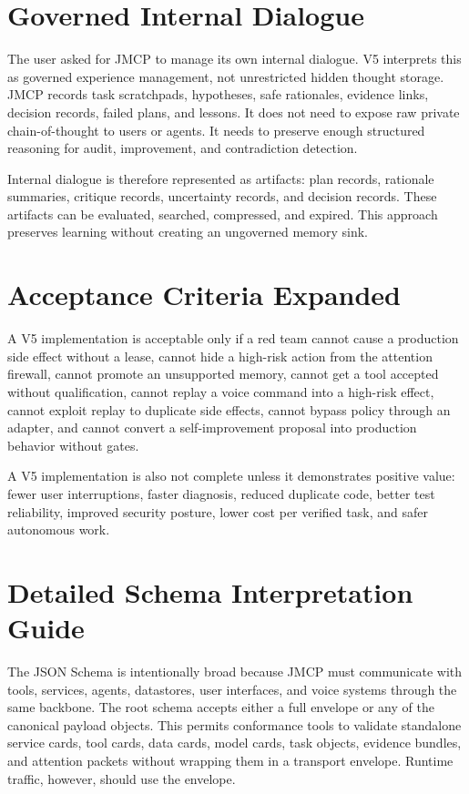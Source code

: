 \documentclass[10pt,journal,onecolumn]{IEEEtran}
\begin{document}
\section{Governed Internal Dialogue}
The user asked for JMCP to manage its own internal dialogue. V5 interprets this as governed experience management, not unrestricted hidden thought storage. JMCP records task scratchpads, hypotheses, safe rationales, evidence links, decision records, failed plans, and lessons. It does not need to expose raw private chain-of-thought to users or agents. It needs to preserve enough structured reasoning for audit, improvement, and contradiction detection.

Internal dialogue is therefore represented as artifacts: plan records, rationale summaries, critique records, uncertainty records, and decision records. These artifacts can be evaluated, searched, compressed, and expired. This approach preserves learning without creating an ungoverned memory sink.

\section{Acceptance Criteria Expanded}
A V5 implementation is acceptable only if a red team cannot cause a production side effect without a lease, cannot hide a high-risk action from the attention firewall, cannot promote an unsupported memory, cannot get a tool accepted without qualification, cannot replay a voice command into a high-risk effect, cannot exploit replay to duplicate side effects, cannot bypass policy through an adapter, and cannot convert a self-improvement proposal into production behavior without gates.

A V5 implementation is also not complete unless it demonstrates positive value: fewer user interruptions, faster diagnosis, reduced duplicate code, better test reliability, improved security posture, lower cost per verified task, and safer autonomous work.




\section{Detailed Schema Interpretation Guide}
The JSON Schema is intentionally broad because JMCP must communicate with tools, services, agents, datastores, user interfaces, and voice systems through the same backbone. The root schema accepts either a full envelope or any of the canonical payload objects. This permits conformance tools to validate standalone service cards, tool cards, data cards, model cards, task objects, evidence bundles, and attention packets without wrapping them in a transport envelope. Runtime traffic, however, should use the envelope.
\end{document}
